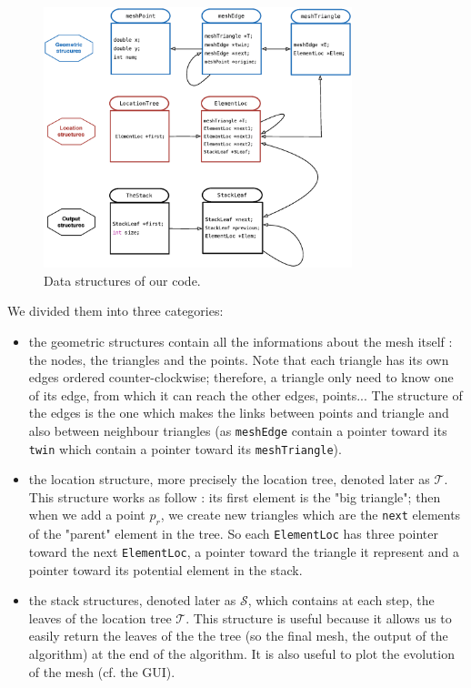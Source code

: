 \begin{figure}[h!]
\centering
\includegraphics[width=0.8\textwidth]{images/dataStruct.eps}
\caption{Data structures of our code.}
\label{fig:dataStruct}
\end{figure}

We divided them into three categories: 
\begin{itemize}
\item the geometric structures contain all the informations about the mesh itself : the nodes, the triangles and the points. Note that each triangle has its own edges ordered counter-clockwise; therefore, a triangle only need to know one of its edge, from which it can reach the other edges, points... The structure of the edges is the one which makes the links between points and triangle and also between neighbour triangles (as \texttt{meshEdge} contain a pointer toward its \texttt{twin} which contain a pointer toward its \texttt{meshTriangle}).
\item the location structure, more precisely the location tree, denoted later as $\mathcal{T}$. This structure works as follow : its first element is the "big triangle"; then when we add a point $p_r$, we create new triangles which are the \texttt{next} elements of the "parent" element in the tree. So each \texttt{ElementLoc} has three pointer toward the next \texttt{ElementLoc}, a pointer toward the triangle it represent and a pointer toward its potential element in the stack.
\item  the stack structures, denoted later as $\mathcal{S}$, which contains at each step, the leaves of the location tree $\mathcal{T}$. This structure is useful because it allows us to easily return the leaves of the the tree (so the final mesh, the output of the algorithm) at the end of the algorithm. It is also useful to plot the evolution of the mesh (cf. the GUI). 
\end{itemize}
 

